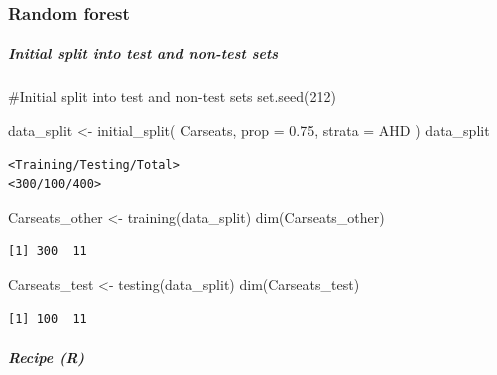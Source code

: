 \documentclass[
]{article}
\let\oldsubparagraph\subparagraph
\renewcommand{\subparagraph}[1]{\oldsubparagraph{#1}\mbox{}}
\newenvironment{Shaded}{\begin{snugshade}}{\end{snugshade}}
\newcommand{\AttributeTok}[1]{\textcolor[rgb]{0.40,0.45,0.13}{#1}}
\newcommand{\CommentTok}[1]{\textcolor[rgb]{0.37,0.37,0.37}{#1}}
\newcommand{\DecValTok}[1]{\textcolor[rgb]{0.68,0.00,0.00}{#1}}
\newcommand{\FloatTok}[1]{\textcolor[rgb]{0.68,0.00,0.00}{#1}}
\newcommand{\FunctionTok}[1]{\textcolor[rgb]{0.28,0.35,0.67}{#1}}
\newcommand{\NormalTok}[1]{\textcolor[rgb]{0.00,0.23,0.31}{#1}}
\newcommand{\OtherTok}[1]{\textcolor[rgb]{0.00,0.23,0.31}{#1}}
\begin{document}
\hypertarget{random-forest-1}{%
\subsubsection{Random forest}\label{random-forest-1}}

\hypertarget{initial-split-into-test-and-non-test-sets-2}{%
\subparagraph{Initial split into test and non-test
sets}\label{initial-split-into-test-and-non-test-sets-2}}

\begin{Shaded}
\begin{Highlighting}[]
\CommentTok{\#Initial split into test and non{-}test sets}
\FunctionTok{set.seed}\NormalTok{(}\DecValTok{212}\NormalTok{)}

\NormalTok{data\_split }\OtherTok{\textless{}{-}} \FunctionTok{initial\_split}\NormalTok{(}
\NormalTok{  Carseats, }
  \AttributeTok{prop =} \FloatTok{0.75}\NormalTok{,}
  \AttributeTok{strata =}\NormalTok{ AHD}
\NormalTok{  )}
\NormalTok{data\_split}
\end{Highlighting}
\end{Shaded}

\begin{verbatim}
<Training/Testing/Total>
<300/100/400>
\end{verbatim}

\begin{Shaded}
\begin{Highlighting}[]
\NormalTok{Carseats\_other }\OtherTok{\textless{}{-}} \FunctionTok{training}\NormalTok{(data\_split)}
\FunctionTok{dim}\NormalTok{(Carseats\_other)}
\end{Highlighting}
\end{Shaded}

\begin{verbatim}
[1] 300  11
\end{verbatim}

\begin{Shaded}
\begin{Highlighting}[]
\NormalTok{Carseats\_test }\OtherTok{\textless{}{-}} \FunctionTok{testing}\NormalTok{(data\_split)}
\FunctionTok{dim}\NormalTok{(Carseats\_test)}
\end{Highlighting}
\end{Shaded}

\begin{verbatim}
[1] 100  11
\end{verbatim}

\hypertarget{recipe-r-2}{%
\subparagraph{Recipe (R)}\label{recipe-r-2}}
\end{document}
